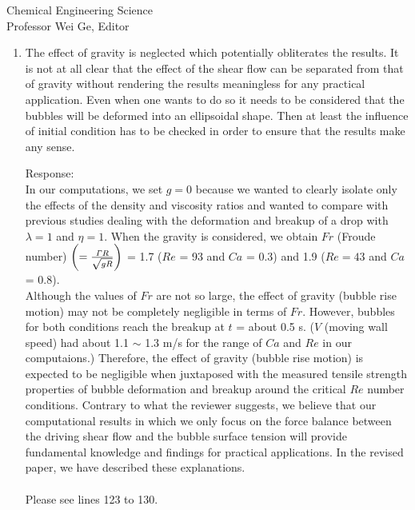 \documentclass{letter}
\begin{document}
\begin{letter}{
Chemical Engineering Science\\
Professor Wei Ge, Editor\\}
\begin{enumerate}
Since it takes a very long computational time to obtain results for the effect of $\lambda$ and $\eta$ on drop deformation and breakup, 
all computations for these conditions have not been finished. We will also present the fruits of research on the effect of density and 
viscosity ratios in the next papers. \\
\\

\par\noindent
\item
\textsf
{The effect of gravity is neglected which potentially obliterates the results. It is not at all clear that the effect of the shear flow can be separated from that of gravity without rendering the results meaningless for any practical application. Even when one wants to do so it needs to be considered that the bubbles will be deformed into an ellipsoidal shape. Then at least the influence of initial condition has to be checked in order to ensure that the results make any sense. \\}
\vspace{3 mm}

Response: \\
In our computations, we set $g = 0$ because we wanted to clearly isolate only the effects of the density and viscosity ratios and 
wanted to compare with previous studies dealing with the deformation and breakup of a drop with $\lambda =1$ and $\eta = 1$.
When the gravity is considered, we obtain $Fr$ (Froude number) $\left(= \frac{{\it \Gamma}R}{\sqrt {gR}} \right)$ = 1.7 ($Re$ = 93 and $Ca$ = 0.3) 
and 1.9 ($Re = 43$ and $Ca$ = 0.8). \\
Although the values of $Fr$ are not so large, the effect of gravity (bubble rise motion) may not be completely negligible in terms of $Fr$.
However, bubbles for both conditions reach the breakup at $t$ = about 0.5 s. 
($V$ (moving wall speed) had about 1.1 $\sim$ 1.3 m/s for the range of $Ca$ and $Re$ in our computaions.)
Therefore, the effect of gravity (bubble rise motion) is expected to be negligible when juxtaposed with the measured tensile strength properties of bubble deformation and breakup 
around the critical $Re$ number conditions. Contrary to what the reviewer suggests, we believe that our computational results in which we only focus on the force balance between the driving shear flow and the bubble surface tension will provide fundamental knowledge and findings for practical applications.  In the revised paper, we have described these explanations.\\
\\
Please see lines 123 to 130.
\\


\end{enumerate}
\end{letter}
\end{document}
